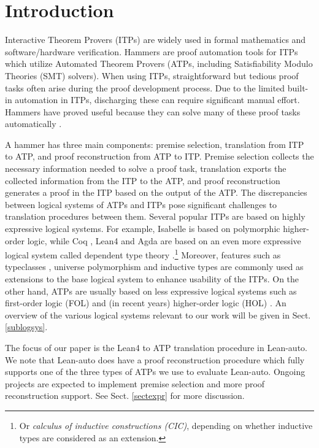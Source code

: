 \section{Introduction}

  Interactive Theorem Provers (ITPs) \cite{Harrison2014HistoryOI}
  are widely used in formal mathematics and software/hardware verification. Hammers
  \cite{Blanchette2016HammeringTQ,Czajka2018HammerFC} are proof automation tools for
  ITPs which utilize Automated Theorem Provers (ATPs, including Satisfiability Modulo Theories (SMT) solvers).
  When using ITPs, straightforward but tedious proof
  tasks often arise during the proof development process.  Due to the limited
  built-in automation in ITPs, discharging these can require significant
  manual effort. Hammers have proved useful
  because they can solve many of these proof tasks automatically \cite{Paulson2012ThreeYO}.
  
  A hammer has three main components: premise selection, translation from ITP to
  ATP, and proof reconstruction from ATP to ITP. Premise selection collects
  the necessary information needed to solve a proof task, translation exports
  the collected information from the ITP to the ATP, and proof reconstruction generates
  a proof in the ITP based on the output of the ATP. The discrepancies between logical systems of ATPs and ITPs pose
  significant challenges to translation procedures between them.
  Several popular ITPs are based on highly expressive logical systems.
  For example, Isabelle \cite{Isabelle} is based on polymorphic higher-order logic, while
  Coq \cite{CoqRefMan}, Lean4 \cite{Lean4} and Agda \cite{Agda}
  are based on an even more expressive logical system called dependent type
  theory \cite{LambdaWithType,Coquand1988}.\footnote{Or \textit{calculus of inductive constructions (CIC)}, depending
  on whether inductive types are considered as an extension.}
  Moreover, features such as typeclasses \cite{TypeClassHaskell}, universe polymorphism \cite{UPolyCoq} and inductive types \cite{CICIndDef}
  are commonly used as extensions to the base logical system to enhance usability of the ITPs.
  On the other hand, ATPs are usually based on less expressive logical systems such
  as first-order logic (FOL) \cite{CVC5,Vampire,Z3Paper,EProver} and (in recent years)
  higher-order logic (HOL) \cite{HOVampire,ZipperpositionMakeWork,HOEProver}.
  An overview of the various logical systems relevant to our work will be given in Sect. \ref{sublogsys}.

  The focus of our paper is the Lean4 to ATP translation procedure in Lean-auto.
  We note that Lean-auto does have a proof reconstruction procedure which fully supports
  one of the three types of ATPs we use to evaluate Lean-auto.
  Ongoing projects are expected to implement premise selection and more proof reconstruction support.
  See Sect. \ref{sectexpr} for more discussion.

